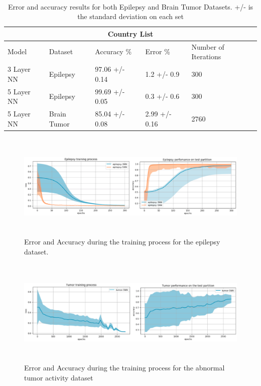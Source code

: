 \documentclass{llncs}       %
\begin{document}
\paragraph{}\paragraph{}

\begin{table}[h!]
\begin{tabular}{ |p{3cm}||p{2cm}|p{2cm}|p{2cm}|p{1.5cm}|  }
 \hline
 \multicolumn{5}{|c|}{Country List} \\
 \hline
 Model     & Dataset &Accuracy \%&Error \%& Number of Iterations\\
 \hline
 3 Layer NN & Epilepsy &97.06 +/- 0.14& 1.2 +/- 0.9 &300\\
 5 Layer NN & Epilepsy  & 99.69 +/- 0.05   &0.3 +/- 0.6 &300\\
 5 Layer NN & Brain Tumor & 85.04 +/- 0.08 &  2.99 +/- 0.16 &2760\\
 \hline
\end{tabular}
\caption{ Error and accuracy results for both Epilepsy and Brain Tumor Datasets. +/- is the standard deviation on each set}
\end{table}



\begin{figure}[h]
\centering
\includegraphics[width=12.08cm,height=5.11cm]{media/results.eps}
\caption{ Error and Accuracy during the training process for the epilepsy dataset.}
\end{figure}


\begin{figure}[h]
\centering
\includegraphics[width=12.08cm,height=5.11cm]{media/results2.eps}
\caption{ Error and Accuracy during the training process for the abnormal tumor activity dataset}
\end{figure}
\end{document}

